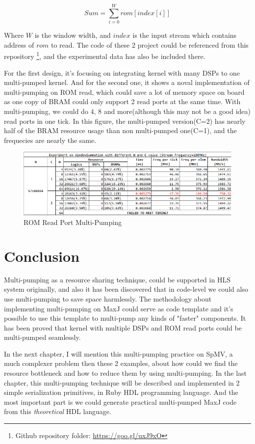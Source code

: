 \documentclass[a4paper, 10pt]{report}
\begin{document}
$$Sum = \sum_{i=0}^W rom[index[i]] $$

Where $W$ is the window width, and $index$ is the input stream which contains address of $rom$ to read. The code of these 2 project could be referenced from this repository \footnote{Github repository folder: \url{https://goo.gl/uxJ9xO}}, and the experimental data has also be included there.

For the first design, it's focusing on integrating kernel with many DSPs to one multi-pumped kernel. And for the second one, it shows a noval implementation of multi-pumping on ROM read, which could save a lot of memory space on board as one copy of BRAM could only support 2 read ports at the same time. With multi-pumping, we could do 4, 8 and more(although this may not be a good idea) read ports in one tick. In this figure, the multi-pumped version(C=2) has nearly half of the BRAM resource usage than non multi-pumped one(C=1), and the frequecies are nearly the same.

\begin{figure}[h!]
  \caption{ROM Read Port Multi-Pumping}
  \centering
    \includegraphics[width=1.0\textwidth]{window-summation}
\end{figure}

\section{Conclusion}
Multi-pumping as a resource sharing technique, could be supported in HLS system originally, and also it has been discovered that in code-level we could also use multi-pumping to save space harmlessly. The methodology about implementing multi-pumping on MaxJ could serve as code template and it's possible to use this template to multi-pump any kinds of "faster" components. It has been proved that kernel with multiple DSPs and ROM read ports could be multi-pumped seamlessly.

In the next chapter, I will mention this multi-pumping practice on SpMV, a much complexer problem then these 2 examples, about how could we find the resource bottleneck and how to reduce them by using multi-pumping. In the last chapter, this multi-pumping technique will be described and implemented in 2 simple serialization primitives, in Ruby HDL programming language. And the most important part is we could generate practical multi-pumped MaxJ code from this \textit{theoretical} HDL language.
\end{document}
